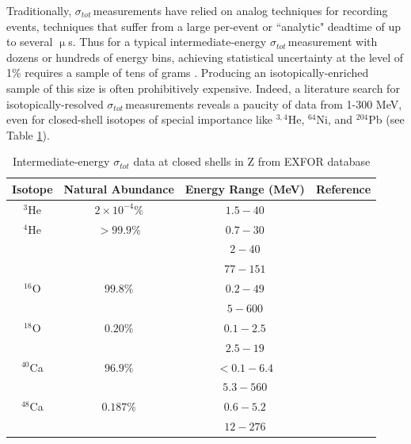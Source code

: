 \documentclass[twocolumn,secnumarabic,amssymb, nobibnotes, aps, prl,
superscriptaddress, nobalancelastpage]{revtex4}
\newcommand{\tots}{\ensuremath{\sigma_{tot}}\,}
\begin{document}
Traditionally, \tots measurements have relied on analog techniques for recording
events, techniques that suffer from a large per-event or ``analytic" deadtime of
up to several $\upmu$s. Thus for a typical intermediate-energy \tots measurement
with dozens or hundreds of energy bins, achieving statistical uncertainty at the
level of 1\% requires a sample of tens of grams \cite{Finlay1993,
Abfalterer2001}. Producing an isotopically-enriched sample of this size is often
prohibitively expensive. Indeed, a literature search for isotopically-resolved
\tots measurements reveals a paucity of data from 1-300 MeV, even for
closed-shell isotopes of special importance like $^{3,4}$He, $^{64}$Ni, and
$^{204}$Pb (see Table \ref{IsotopicCrossSectionTable}).

\begin{table}[ht]
    \caption{Intermediate-energy $\sigma_{tot}$ data at closed shells in Z from
    EXFOR database}
    \label{IsotopicCrossSectionTable}
    \begin{center}
        \begin{tabular}{ c c c c }
            \hline
            Isotope & Natural Abundance & Energy Range (MeV) & Reference\\
            \hline

            $^{3}$He & $2\times 10^{-4}\%$ & $1.5 - 40$ & \cite{Haesner1983}\\
            $^{4}$He & $>99.9\%$ & $0.7-30$ & \cite{Goulding1973}\\
            & & $2-40$ & \cite{Haesner1983}\\
            & & $77-151$ & \cite{Measday1966}\\

            $^{16}$O & $99.8\%$ & $0.2-49$ & \cite{Perey1972}\\
            & & $5-600$ & \cite{Finlay1993}\\

            $^{18}$O & $0.20\%$ & $0.1-2.5$ & \cite{Vaughn1965}\\
            & & $2.5-19$ & \cite{Salisbury1965}\\

            $^{40}$Ca & $96.9\%$ & $<0.1-6.4$ & \cite{Johnson1973}\\
            & & $5.3-560$ & \cite{Abfalterer2001}\\

            $^{48}$Ca & $0.187\%$ & $0.6-5.2$ & \cite{Harvey1985}\\
            & & $12-276$ & \cite{Shane2010}\\


\end{tabular}
\end{center}
\end{table}
\end{document}
